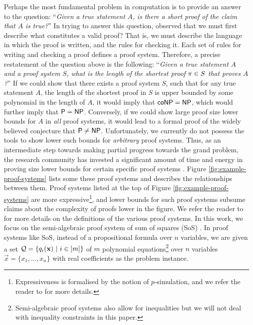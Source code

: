 \documentclass[11pt]{article}
\begin{document}
Perhaps the most fundamental problem in computation is to provide an answer to the question: ``\textit{Given a true statement $A$, is there a short proof of the claim that $A$ is true?}''
In trying to answer this question, \citet{cook1979relative} observed that we must first describe what constitutes a valid proof?
That is, we must describe the language in which the proof is written, and the rules for checking it.
Each set of rules for writing and checking a proof defines a proof system.
Therefore, a precise restatement of the question above is the following:  ``\textit{Given a true statement $A$ and a proof system $S$, what is the length of the shortest proof $\pi \in S$ that proves $A$?}''
If we could show that there exists a proof system $S$, such that for any true statement $A$, the length of the shortest proof in $S$ is upper bounded by some polynomial in the length of $A$, it would imply that $\mathsf{coNP} = \mathsf{NP}$, which would further imply that $\mathsf{P} = \mathsf{NP}$.
Conversely, if we could show large proof size lower bounds for $A$ in \emph{all} proof systems, it would lead to a formal proof of the widely believed conjecture that $\mathsf{P} \neq \mathsf{NP}$.
Unfortunately, we currently do not possess the tools to show lower such bounds for \emph{arbitrary} proof systems.
Thus, as an intermediate step towards making partial progress towards the grand problem, the research community has invested a significant amount of time and energy in proving size lower bounds for certain specific proof systems \citep{blake1937canonical,razborov1998lower, impagliazzo1999lower, alekhnovich2001lower, buss1999linear}.
 Figure \ref{fig:example-proof-systems} lists some these proof systems and describes the relationships between them.
Proof systems listed at the top of Figure \ref{fig:example-proof-systems} are more expressive\footnote{Expressiveness is formalised by the notion of $p$-simulation, and we refer the reader to \citep[Definition 1.6]{ProofComplexityLecNotes} for more details.}, and lower bounds for such proof systems subsume claims about the complexity of proofs lower in the figure.
We refer the reader to \citep{krajicek2019proof, ProofComplexityLecNotesPaul} for more details on the definitions of the various proof systems.
In this work, we focus on the semi-algebraic proof system of sum of squares (SoS) \citep{parrilo2000structured, boazCourse}.
In proof systems like SoS, instead of a propositional formula over $n$ variables, we are given a set $\mathcal{Q} =\{q_i(\mathbf{x}) \text{ } |\text{ } i \in [m] \}$ of $m$ polynomial equations\footnote{Semi-algebraic proof systems also allow for inequalities but we will not deal with inequality constraints in this paper.} over $n$ variables $\vec{x} = \{x_1, \dots, x_n\}$ with real coefficients as the problem instance.
\end{document}
